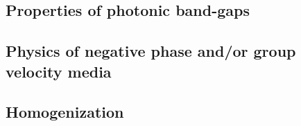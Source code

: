 \subsection{Properties of photonic band-gaps}
\subsection{Physics of negative phase and/or group velocity media}


\subsection{Homogenization}



